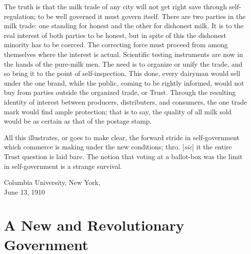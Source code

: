 \documentclass[openany,nobib]{tufte-book}
\let\oldchapter\chapter
\def\chapter{%
  \setcounter{footnote}{0}%
  \oldchapter
}
\begin{document}
\newpage The truth is that the milk trade of any city will not get right save
through self-regulation; to be well governed it must govern itself.
There are two parties in the milk trade: one standing for honest and the
other for dishonest milk. It is to the real interest of both par­ties to
be honest, but in spite of this the dishonest minority has to be
coerced. The correcting force must proceed from among themselves where
the interest is actual. Scientific testing instruments are now in the
hands of the pure-milk men. The need is to organize or unify the trade,
and so bring it to the point of self-inspection. This done, every
dairyman would sell under the one brand, while the public, coming to be
rightly informed, would not buy from parties outside the organ­ized
trade, or Trust. Through the resulting identity of interest be­tween
producers, distributers, and consumers, the one trade mark would find
ample protection; that is to say, the quality of all milk sold would be
as certain as that of the postage stamp.

All this illustrates, or goes to make clear, the forward stride in
self-government which commerce is making under the new conditions; thro.
{[}\emph{sic}{]} it the entire Trust question is laid bare. The notion
that voting at a ballot-box was the limit in self-government is a
strange survival.

\vspace{0.1in}

\hspace{2.5in}{\large Franklin Ford}

\vspace{0.1in}


\noindent Columbia University, New York,\\ June 13, 1910

\chapter[A New and Revolutionary Government]{A New and Revolutionary Government}
\label{ch:A New and Revolutionary Government}

\vspace{.2in}

\begin{LARGE}


\end{LARGE}
\end{document}
